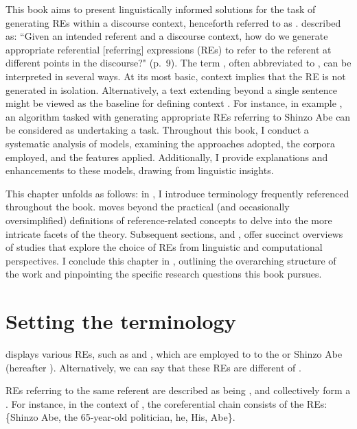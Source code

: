 This book aims to present linguistically informed solutions for the task of generating REs within a discourse context, henceforth referred to as \term{\context}. \citet{belz2007generation} described \context as: ``Given an intended referent and a discourse context, how do we generate appropriate referential [referring] expressions (REs) to refer to the referent at different points in the discourse?" (p.~9). The term , often abbreviated to , can be interpreted in several ways. At its most basic, context implies that the RE is not generated in isolation. Alternatively, a text extending beyond a single sentence might be viewed as the baseline for defining context \citep{belz2010generating}. For instance, in example , an algorithm tasked with generating appropriate REs referring to Shinzo Abe can be considered as undertaking a \context task. Throughout this book, I conduct a systematic analysis of \context models, examining the approaches adopted, the corpora employed, and the features applied. Additionally, I provide explanations and enhancements to these models, drawing from linguistic insights.

This chapter unfolds as follows: in , I introduce terminology frequently referenced throughout the book.   moves beyond the practical (and occasionally oversimplified) definitions of reference-related concepts to delve into the more intricate facets of the theory. Subsequent sections,  and , offer succinct overviews of studies that explore the choice of REs from linguistic and computational perspectives. I conclude this chapter in , outlining the overarching structure of the work and pinpointing the specific research questions this book pursues.

\section{Setting the terminology}\label{sec:terminology}
 displays various REs, such as  and , which are employed to  to the  or  Shinzo Abe (hereafter ). Alternatively, we can say that these REs are different  of .

REs referring to the same referent are described as being , and collectively form a . For instance, in the context of , the coreferential chain consists of the REs: \{Shinzo Abe, the 65-year-old politician, he, His, Abe\}.

